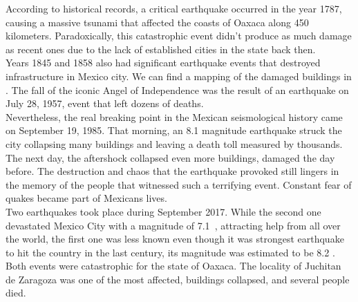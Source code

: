 According to historical records, a critical earthquake occurred in the year 1787, causing a massive tsunami that affected the coasts of Oaxaca along 450 kilometers. Paradoxically, this catastrophic event didn't produce as much damage as recent ones due to the lack of established cities in the state back then.\\

Years 1845 and 1858 also had significant earthquake events that destroyed infrastructure in Mexico city. We can find a mapping of the damaged buildings in \cite{AG3316}. The fall of the iconic Angel of Independence was the result of an earthquake on July 28, 1957, event that left dozens of deaths.\\

Nevertheless, the real breaking point in the Mexican seismological history came on September 19, 1985. That morning, an 8.1 magnitude earthquake struck the city collapsing many buildings and leaving a death toll measured by thousands. The next day, the aftershock collapsed even more buildings, damaged the day before. The destruction and chaos that the earthquake provoked still lingers in the memory of the people that witnessed such a terrifying event. Constant fear of quakes became part of Mexicans lives.\\

Two earthquakes took place during September 2017. While the second one devastated Mexico City with a magnitude of 7.1 \cite{SSNMX_rep_esp_20170919}, attracting help from all over the world, the first one was less known even though it was strongest earthquake to hit the country in the last century, its magnitude was estimated to be 8.2 \cite{SSNMX_rep_esp_20170907}. Both events were catastrophic for the state of Oaxaca. The locality of Juchitan de Zaragoza was one of the most affected, buildings collapsed, and several people died.\\


